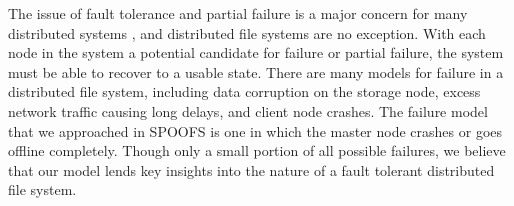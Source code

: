 The issue of fault tolerance and partial failure is a major concern for many distributed systems \cite{waldo_note94}, and distributed file systems are no exception.  With each node in the system a potential candidate for failure or partial failure, the system must be able to recover to a usable state.  There are many models for failure in a distributed file system, including data corruption on the storage node, excess network traffic causing long delays, and client node crashes.  The failure model that we approached in SPOOFS is one in which the master node crashes or goes offline completely.  Though only a small portion of all possible failures, we believe that our model lends key insights into the nature of a fault tolerant distributed file system.
